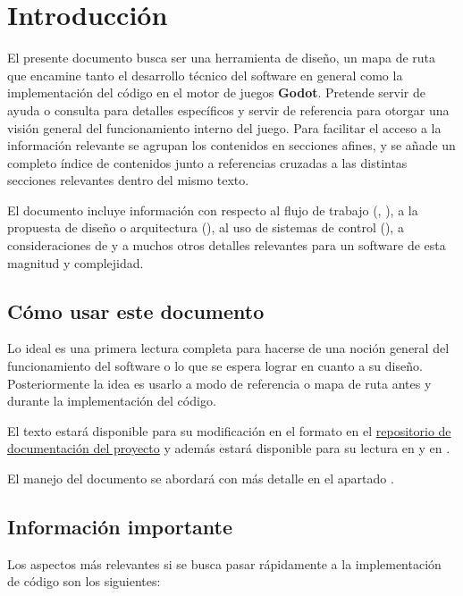 
\section{Introducción}\label{intro:introduccion}

El presente documento busca ser una herramienta de diseño, un mapa de ruta que encamine tanto el desarrollo técnico del software en general como la implementación del código en el motor de juegos \textbf{Godot}. Pretende servir de ayuda o consulta para detalles específicos y servir de referencia para otorgar una visión general del funcionamiento interno del juego. Para facilitar el acceso a la información relevante se agrupan los contenidos en secciones afines, y se añade un completo índice de contenidos junto a referencias cruzadas a las distintas secciones relevantes dentro del mismo texto.

El documento incluye información con respecto al flujo de trabajo (, ), a la propuesta de diseño o arquitectura (), al uso de sistemas de control  (), a consideraciones de  y a muchos otros detalles relevantes para un software de esta magnitud y complejidad.

\subsection{Cómo usar este documento}\label{intro:como-usar-el-documento}
Lo ideal es una primera lectura completa para hacerse de una noción general del funcionamiento del software o lo que se espera lograr en cuanto a su diseño. Posteriormente la idea es usarlo a modo de referencia o mapa de ruta antes y durante la implementación del código.

El texto estará disponible para su modificación en el formato  en el \href{https://github.com/polirritmico/Bakumapu-docs}{repositorio de documentación del proyecto} y además estará disponible para su lectura en \href{https://polirritmico.github.io/Bakumapu-docs/}{} y en \href{https://github.com/polirritmico/Bakumapu-docs/blob/main/main.pdf}{}.

El manejo del documento se abordará con más detalle en el apartado .

\subsection{Información importante}
\noindent Los aspectos más relevantes si se busca pasar rápidamente a la implementación de código son los siguientes:

